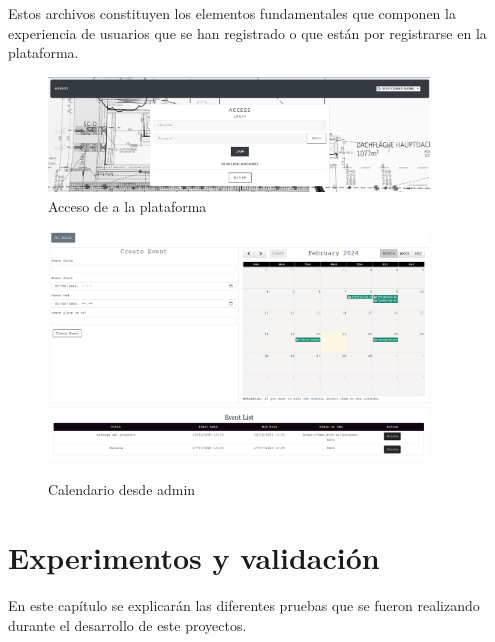 \documentclass[a4paper, 12pt]{book}
\begin{document}
Estos archivos constituyen los elementos fundamentales que componen la experiencia de usuarios que se han registrado o que están por registrarse en la plataforma.
\begin{figure}
  \centering
  \includegraphics[width=0.9\textwidth]{img/acceso.png}
  \caption{Acceso de a la plataforma}
  \label{fig:adminacceso}
\end{figure}
\begin{figure}
  \centering
  \includegraphics[width=0.9\textwidth]{img/calendarioadmin.png}
  \includegraphics[width=0.9\textwidth]{img/calendarioadmin2.png}
  \caption{Calendario desde admin}
  \label{fig:admincal}
\end{figure}


\cleardoublepage
\chapter{Experimentos y validación}
\label{chap:experimentos}

En este capítulo se explicarán las diferentes pruebas que se fueron realizando durante el desarrollo de este proyectos.
\end{document}
